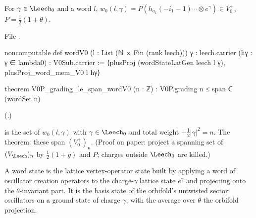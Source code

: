 \begin{definition}\label{ch12:def:wordV0}
For $\gamma\in\Leech_0$ and a word $l$, $w_0(l,\gamma)=P(h_{a_1}(-i_1-1)\cdots\otimes e^\gamma)\in V_0^+$,
$P=\tfrac12(1+\theta)$.
\end{definition}
File .
\begin{leancode}
noncomputable def wordV0 (l : List (ℕ × Fin (rank leech))) {γ : leech.carrier} (hγ : γ ∈ lambda0) :
    V0Sub.carrier :=
  ⟨plusProj (wordStateLatGen leech l γ), plusProj_word_mem_V0 l hγ⟩

theorem V0P_grading_le_span_wordV0 (n : ℤ) : V0P.grading n ≤ span ℂ (wordSet n)
\end{leancode}
(.)
\begin{dictionary}
 is the set of $w_0(l,\gamma)$ with $\gamma\in\Leech_0$ and total weight
 $+\tfrac12|\gamma|^2=n$.  The theorem: these span $(V_0^+)_n$.  (Proof on paper:
project a spanning set of $(V_\Leech)_n$ by $\tfrac12(1+g)$ and $P$; charges outside $\Leech_0$ are killed.)
\end{dictionary}

\begin{physics}
A word state is the lattice vertex-operator state built by applying a word of oscillator creation operators to the charge-$\gamma$ lattice state $e^\gamma$ and projecting onto the $\theta$-invariant part. It is the basis state of the orbifold's untwisted sector: oscillators on a ground state of charge $\gamma$, with the average over $\theta$ the orbifold projection.
\end{physics}

